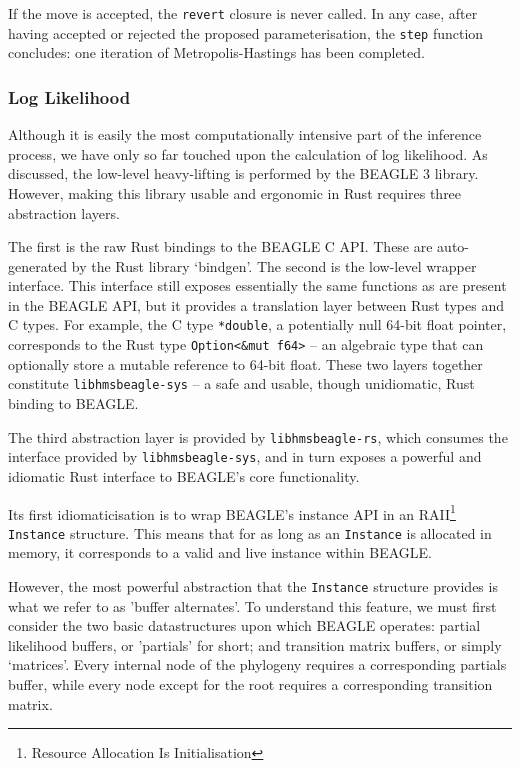 \documentclass[10pt,journal,compsoc]{IEEEtran}
\begin{document}
If the move is accepted, the \texttt{revert} closure is never called. In any case, after having accepted or rejected the proposed parameterisation, the \texttt{step} function concludes: one iteration of Metropolis-Hastings has been completed.


\subsubsection{Log Likelihood}
  
Although it is easily the most computationally intensive part of the inference process, we have only so far touched upon the calculation of log likelihood. As discussed, the low-level heavy-lifting is performed by the BEAGLE 3 library. However, making this library usable and ergonomic in Rust requires three abstraction layers.

The first is the raw Rust bindings to the BEAGLE C API. These are auto-generated by the Rust library `bindgen'. The second is the low-level wrapper interface. This interface still exposes essentially the same functions as are present in the BEAGLE API, but it provides a translation layer between Rust types and C types. For example, the C type \texttt{*double}, a potentially null 64-bit float pointer, corresponds to the Rust type \texttt{Option<\&mut f64>} -- an algebraic type that can optionally store a mutable reference to 64-bit float. These two layers together constitute \texttt{libhmsbeagle-sys} -- a safe and usable, though unidiomatic, Rust binding to BEAGLE.

The third abstraction layer is provided by \texttt{libhmsbeagle-rs}, which consumes the interface provided by \texttt{libhmsbeagle-sys}, and in turn exposes a powerful and idiomatic Rust interface to BEAGLE's core functionality.

Its first idiomaticisation is to wrap BEAGLE's instance API in an RAII\footnote{Resource Allocation Is Initialisation} \texttt{Instance} structure. This means that for as long as an \texttt{Instance} is allocated in memory, it corresponds to a valid and live instance within BEAGLE.

However, the most powerful abstraction that the \texttt{Instance} structure provides is what we refer to as 'buffer alternates'. To understand this feature, we must first consider the two basic datastructures upon which BEAGLE operates: partial likelihood buffers, or 'partials' for short; and transition matrix buffers, or simply `matrices'. Every internal node of the phylogeny requires a corresponding partials buffer, while every node except for the root requires a corresponding transition matrix.
\end{document}
